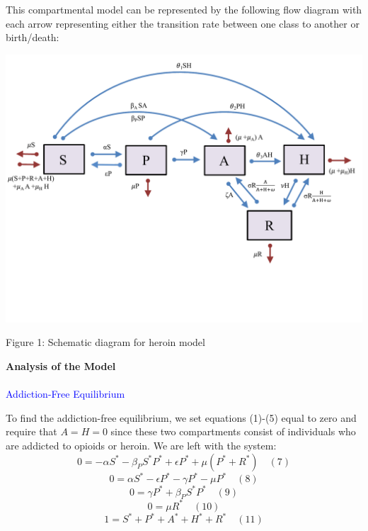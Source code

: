 \documentclass[12pt]{article}
\begin{document}
This compartmental model can be represented by the following flow diagram with each arrow representing either the transition rate between one class to another or birth/death: 

\includegraphics[scale=0.6]{heroin_schematic.pdf}
\vspace{-0.8cm}
\begin{center}
Figure 1: Schematic diagram for heroin model
\end{center}



\textbf{Analysis of the Model} \\ \\

 \textcolor{blue}{Addiction-Free Equilibrium} 

To find the addiction-free equilibrium, we set equations (1)-(5) equal to zero and require that $A=H=0$ since these two compartments consist of individuals who are addicted to opioids or heroin. We are left with the system: \\
\[0=-\alpha S^* -\beta_{P} S^* P^* + \epsilon P^* +\mu (P^* + R^*) \quad (7)\]
\[0=\alpha S^* - \epsilon P^* -\gamma P^* - \mu P^* \quad(8)\]
\[0=\gamma P^* + \beta_{P} S^* P^*   \quad(9)\]
\[0=\mu R^* \quad(10)\]
\[1=S^*+P^*+A^*+H^*+R^* \quad(11)\]
\end{document}

